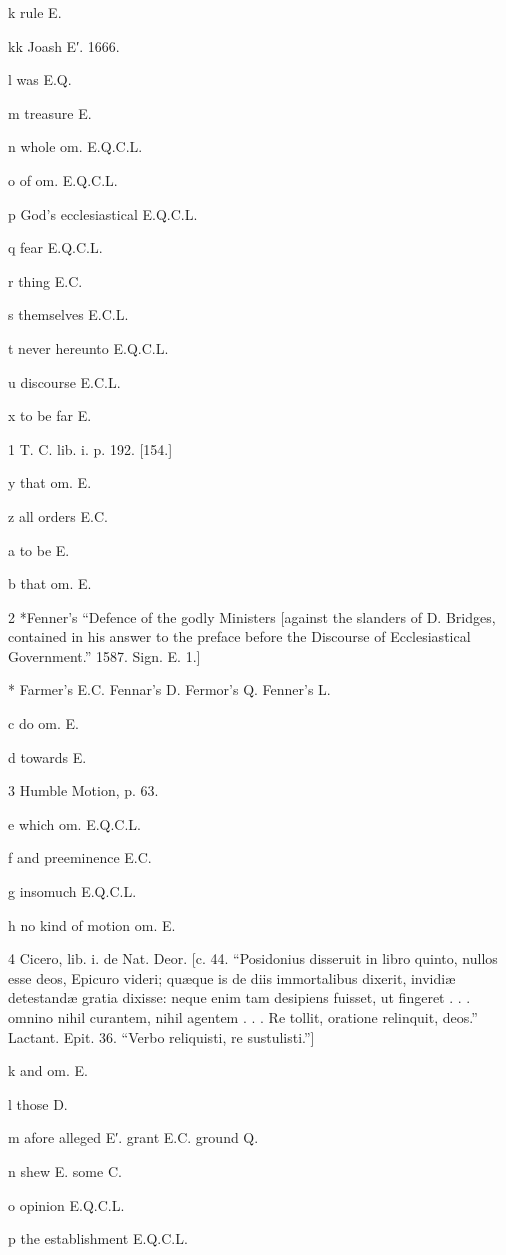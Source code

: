 k
rule E.

kk
Joash E′. 1666.

l
was E.Q.

m
treasure E.

n
whole om. E.Q.C.L.

o
of om. E.Q.C.L.

p
God’s ecclesiastical E.Q.C.L.

q
fear E.Q.C.L.

r
thing E.C.

s
themselves E.C.L.

t
never hereunto E.Q.C.L.

u
discourse E.C.L.

x
to be far E.

1
T. C. lib. i. p. 192. [154.]

y
that om. E.

z
all orders E.C.

a
to be E.

b
that om. E.

2
*Fenner’s “Defence of the godly Ministers [against the slanders of D. Bridges, contained in his answer to the preface before the Discourse of Ecclesiastical Government.” 1587. Sign. E. 1.]

*
Farmer’s E.C. Fennar’s D. Fermor’s Q. Fenner’s L.

c
do om. E.

d
towards E.

3
Humble Motion, p. 63.

e
which om. E.Q.C.L.

f
and preeminence E.C.

g
insomuch E.Q.C.L.

h
no kind of motion om. E.

4
Cicero, lib. i. de Nat. Deor. [c. 44. “Posidonius disseruit in libro quinto, nullos esse deos, Epicuro videri; quæque is de diis immortalibus dixerit, invidiæ detestandæ gratia dixisse: neque enim tam desipiens fuisset, ut fingeret . . . omnino nihil curantem, nihil agentem . . . Re tollit, oratione relinquit, deos.” Lactant. Epit. 36. “Verbo reliquisti, re sustulisti.”]

k
and om. E.

l
those D.

m
afore alleged E′. grant E.C. ground Q.

n
shew E. some C.

o
opinion E.Q.C.L.

p
the establishment E.Q.C.L.

